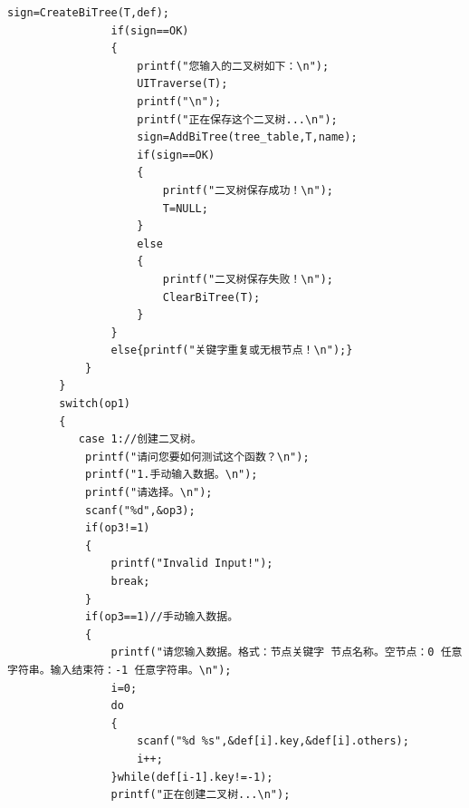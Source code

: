 \documentclass[supercite]{Experimental_Report}
\theoremstyle{definition}
\begin{document}
\begin{lstlisting}[title =演示系统,frame=none]
				sign=CreateBiTree(T,def); 
				if(sign==OK)
				{
					printf("您输入的二叉树如下：\n");
					UITraverse(T);
					printf("\n");
					printf("正在保存这个二叉树...\n");
					sign=AddBiTree(tree_table,T,name);
					if(sign==OK)
					{
						printf("二叉树保存成功！\n");
						T=NULL;
					}
					else
					{
						printf("二叉树保存失败！\n");
						ClearBiTree(T);
					}
				}
				else{printf("关键字重复或无根节点！\n");}
			}
		}
		switch(op1)
		{
		   case 1://创建二叉树。 
			printf("请问您要如何测试这个函数？\n");
			printf("1.手动输入数据。\n"); 
			printf("请选择。\n");
			scanf("%d",&op3);
			if(op3!=1)
			{
				printf("Invalid Input!");
				break;
			}
			if(op3==1)//手动输入数据。 
			{
				printf("请您输入数据。格式：节点关键字 节点名称。空节点：0 任意字符串。输入结束符：-1 任意字符串。\n");
				i=0;
				do
				{
					scanf("%d %s",&def[i].key,&def[i].others);
					i++;
				}while(def[i-1].key!=-1);
				printf("正在创建二叉树...\n"); 
	

\end{lstlisting}
\end{document}
